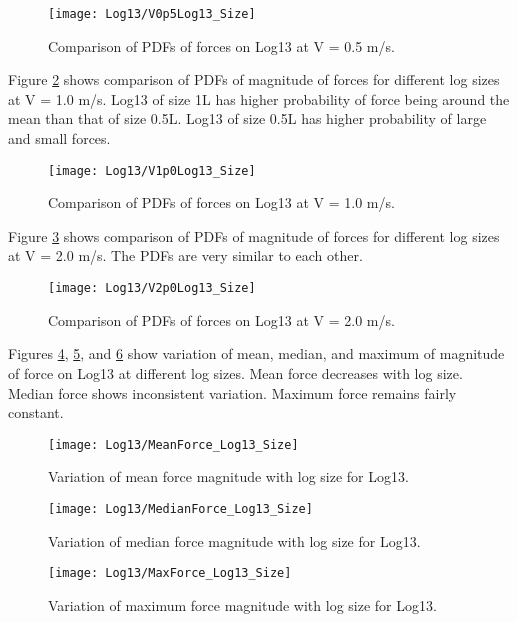 \begin{figure}
\centering
\texttt{[image: Log13/V0p5Log13\_Size]}
\caption{\label{fig:V0p5Log13_Size}Comparison of PDFs of forces on Log13 at V = 0.5 m/s.}
\end{figure}

\noindent Figure \ref{fig:V1p0Log13_Size} shows comparison of PDFs of magnitude of forces for different log sizes at V = 1.0 m/s. Log13 of size 1L has higher probability of force being around the mean than that of size 0.5L. Log13 of size 0.5L has higher probability of large and small forces.

\begin{figure}
\centering
\texttt{[image: Log13/V1p0Log13\_Size]}
\caption{\label{fig:V1p0Log13_Size}Comparison of PDFs of forces on Log13 at V = 1.0 m/s.}
\end{figure}

\noindent Figure \ref{fig:V2p0Log13_Size} shows comparison of PDFs of magnitude of forces for different log sizes at V = 2.0 m/s. The PDFs are very similar to each other. 

\begin{figure}
\centering
\texttt{[image: Log13/V2p0Log13\_Size]}
\caption{\label{fig:V2p0Log13_Size}Comparison of PDFs of forces on Log13 at V = 2.0 m/s.}
\end{figure}

\noindent Figures \ref{fig:MeanForce_Log13_Size}, \ref{fig:MedianForce_Log13_Size}, and \ref{fig:MaxForce_Log13_Size} show variation of mean, median, and maximum of magnitude of force on Log13 at different log sizes. Mean force decreases with log size. Median force shows inconsistent variation. Maximum force remains fairly constant. 

\begin{figure}
\centering
\texttt{[image: Log13/MeanForce\_Log13\_Size]}
\caption{\label{fig:MeanForce_Log13_Size}Variation of mean force magnitude with log size for Log13.}
\end{figure}
\begin{figure}
\centering
\texttt{[image: Log13/MedianForce\_Log13\_Size]}
\caption{\label{fig:MedianForce_Log13_Size}Variation of median force magnitude with log size for Log13.}
\end{figure}
\begin{figure}
\centering
\texttt{[image: Log13/MaxForce\_Log13\_Size]}
\caption{\label{fig:MaxForce_Log13_Size}Variation of maximum force magnitude with log size for Log13.}
\end{figure}

